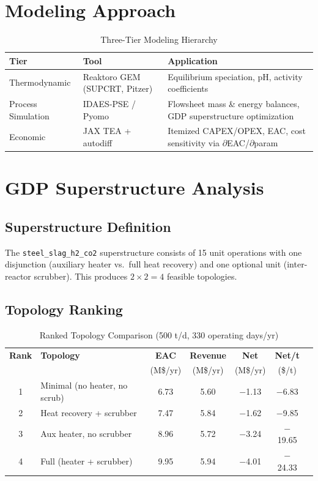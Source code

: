 \documentclass[11pt,a4paper]{article}
\begin{document}
\section{Modeling Approach}

\begin{table}[H]
\centering
\caption{Three-Tier Modeling Hierarchy}
\label{tab:modeling}
\begin{tabular}{p{3cm}p{4cm}p{5cm}}
\toprule
\textbf{Tier} & \textbf{Tool} & \textbf{Application} \\
\midrule
Thermodynamic & Reaktoro GEM (SUPCRT, Pitzer) & Equilibrium speciation, pH, activity coefficients \\
Process Simulation & IDAES-PSE / Pyomo & Flowsheet mass \& energy balances, GDP superstructure optimization \\
Economic & JAX TEA + autodiff & Itemized CAPEX/OPEX, EAC, cost sensitivity via $\partial$EAC/$\partial$param \\
\bottomrule
\end{tabular}
\end{table}

\section{GDP Superstructure Analysis}

\subsection{Superstructure Definition}

The \texttt{steel\_slag\_h2\_co2} superstructure consists of 15 unit operations with one disjunction (auxiliary heater vs.\ full heat recovery) and one optional unit (inter-reactor scrubber).
This produces $2 \times 2 = 4$ feasible topologies.

\subsection{Topology Ranking}

\begin{table}[H]
\centering
\caption{Ranked Topology Comparison (500 t/d, 330 operating days/yr)}
\label{tab:ranking}
\begin{tabular}{clccccc}
\toprule
\textbf{Rank} & \textbf{Topology} & \textbf{EAC} & \textbf{Revenue} & \textbf{Net} & \textbf{Net/t} \\
 & & (M\$/yr) & (M\$/yr) & (M\$/yr) & (\$/t) \\
\midrule
1 & Minimal (no heater, no scrub) & 6.73 & 5.60 & $-$1.13 & $-$6.83 \\
2 & Heat recovery + scrubber      & 7.47 & 5.84 & $-$1.62 & $-$9.85 \\
3 & Aux heater, no scrubber       & 8.96 & 5.72 & $-$3.24 & $-$19.65 \\
4 & Full (heater + scrubber)      & 9.95 & 5.94 & $-$4.01 & $-$24.33 \\
\bottomrule
\end{tabular}
\end{table}
\end{document}
